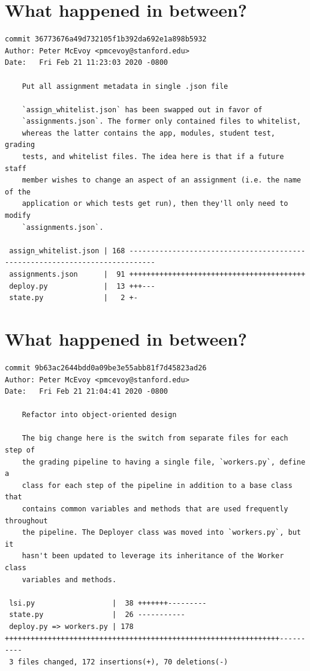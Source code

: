 \documentclass{article}
\begin{document}
\newpage

\section*{What happened in between?}
\vspace{2ex}
\begin{verbatim}
commit 36773676a49d732105f1b392da692e1a898b5932
Author: Peter McEvoy <pmcevoy@stanford.edu>
Date:   Fri Feb 21 11:23:03 2020 -0800

    Put all assignment metadata in single .json file
    
    `assign_whitelist.json` has been swapped out in favor of
    `assignments.json`. The former only contained files to whitelist,
    whereas the latter contains the app, modules, student test, grading
    tests, and whitelist files. The idea here is that if a future staff
    member wishes to change an aspect of an assignment (i.e. the name of the
    application or which tests get run), then they'll only need to modify
    `assignments.json`.

 assign_whitelist.json | 168 ----------------------------------------------------------------------------
 assignments.json      |  91 +++++++++++++++++++++++++++++++++++++++++
 deploy.py             |  13 +++---
 state.py              |   2 +-
\end{verbatim}

\newpage

\section*{What happened in between?}
\vspace{2ex}
\begin{verbatim}
commit 9b63ac2644bdd0a09be3e55abb81f7d45823ad26
Author: Peter McEvoy <pmcevoy@stanford.edu>
Date:   Fri Feb 21 21:04:41 2020 -0800

    Refactor into object-oriented design
    
    The big change here is the switch from separate files for each step of
    the grading pipeline to having a single file, `workers.py`, define a
    class for each step of the pipeline in addition to a base class that
    contains common variables and methods that are used frequently throughout
    the pipeline. The Deployer class was moved into `workers.py`, but it
    hasn't been updated to leverage its inheritance of the Worker class
    variables and methods.

 lsi.py                  |  38 +++++++---------
 state.py                |  26 -----------
 deploy.py => workers.py | 178 ++++++++++++++++++++++++++++++++++++++++++++++++++++++++++++++++----------
 3 files changed, 172 insertions(+), 70 deletions(-)
\end{verbatim}
\end{document}
